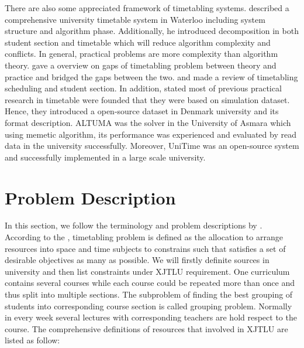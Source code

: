 \documentclass{article}
\begin{document}
There are also some appreciated framework of timetabling systems. \cite{(carter2000)comprehensive} described a comprehensive university timetable system in Waterloo including system structure and algorithm phase. Additionally, he introduced decomposition in both student section and timetable which will reduce algorithm complexity and conflicts. In general, practical problems are more complexity than algorithm theory. \cite{(mccollum2006)perspective} gave a overview on gaps of timetabling problem between theory and practice and bridged the gaps between the two.  \cite{(kristiansen2013)comprehensive} and \cite{(johnes2015)operational} made a review of timetabling scheduling and student section. In addition, \cite{(kristiansen2013)comprehensive} stated most of previous practical research in timetable were founded that they were based on simulation dataset. Hence, they introduced a open-source dataset in Denmark university and its format description. ALTUMA \citep{(tesfaldet2008)automated} was the solver in the University of Asmara which using memetic algorithm, its performance was experienced and evaluated by read data in the university successfully. Moreover, UniTime \citep{(muller2016)reallife} was an open-source system and successfully implemented in a large scale university.


\newpage

\section{Problem Description}
\label{sec: Problem Description}

In this section, we follow the terminology and problem descriptions by \cite{(werra1985)introduction}. According to the \cite{(wren1996)scheduling}, timetabling problem is defined as the allocation to arrange resources into space and time subjects to constrains such that satisfies a set of desirable objectives as many as possible. We will firstly definite sources in university and then list constraints under XJTLU requirement. One curriculum contains several courses while each course could be repeated more than once and thus split into multiple sections. The subproblem of finding the best grouping of students into corresponding course section is called grouping problem. Normally in every week several lectures with corresponding teachers are hold respect to the course. The comprehensive definitions of resources that involved in XJTLU are listed as follow:
\end{document}
